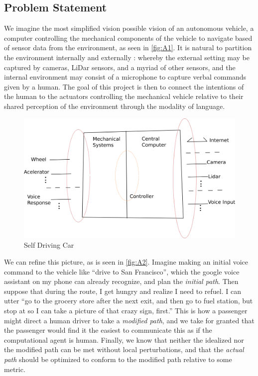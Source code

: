 \documentclass[a4paper, 11pt]{article}
\begin{document}
\subsection{Problem Statement}

We imagine the most simplified vision possible vision of an autonomous
vehicle, a computer controlling the mechanical components of the vehicle to
navigate based of sensor data from the environment, as seen in \autoref{fig:A1}.
It is natural to partition the environment internally and externally : whereby
the external setting may be captured by cameras, LiDar sensors, and a myriad of other
sensors, and the internal environment may consist of a microphone to capture
verbal commands given by a human. The goal of this project is then to connect
the intentions of the human to the actuators controlling the
mechanical vehicle relative to their shared perception of the environment
through the modality of language.

\begin{figure}
\centering
\includegraphics[width=150mm]{pics/selfDriving.png}
\caption{Self Driving Car}\label{fig:A1}
\end{figure}

We can refine this picture, as is seen in \autoref{fig:A2}. Imagine making an
initial voice command to the vehicle like ``drive to San Francisco'', which the
google voice assistant on my phone can already recognize, and plan the
\emph{initial path}. Then suppose that during the route, I get hungry and
realize I need to refuel. I can utter ``go to the grocery store after the next
exit, and then go to fuel station, but stop at so I can take a picture of that
crazy sign, first.'' This is how a passenger might direct a human driver to take
a \emph{modified path}, and we take for granted that the passenger would find it
the easiest to communicate this as if the computational agent is human. Finally,
we know that neither the idealized nor the modified path can be met without
local perturbations, and that the \emph{actual path} should be optimized to
conform to the modified path relative to some metric.
\end{document}
